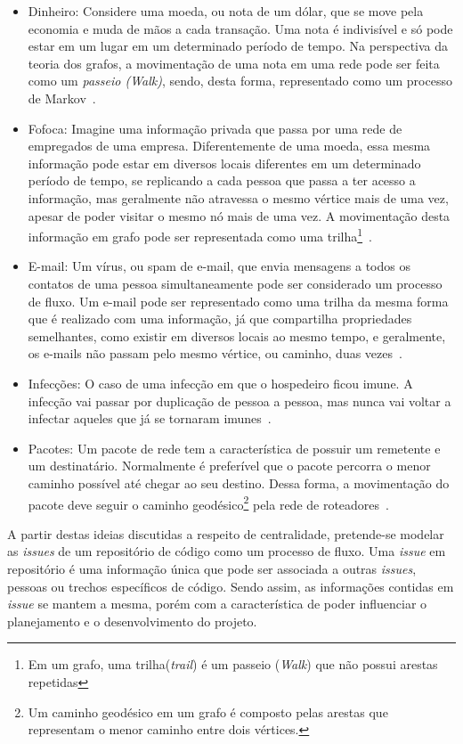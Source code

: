 \begin{itemize}
\item Dinheiro: Considere uma moeda, ou nota de um dólar, que se move pela economia e muda de mãos a cada transação. Uma nota é indivisível e só pode estar em um lugar em um determinado período de tempo. Na perspectiva da teoria dos grafos, a movimentação de uma nota em uma rede pode ser feita como um \textit{passeio (Walk)}, sendo, desta forma, representado como um processo de Markov~\cite{ceflow}.
\item Fofoca: Imagine uma informação privada que passa por uma rede de empregados de uma empresa. Diferentemente de uma moeda, essa mesma informação pode estar em diversos locais diferentes em um determinado período de tempo, se replicando a cada pessoa que passa a ter acesso a informação, mas geralmente não atravessa o mesmo vértice mais de uma vez, apesar de poder visitar o mesmo nó mais de uma vez. A movimentação desta informação em grafo pode ser representada como uma trilha\footnote{Em um grafo, uma trilha(\textit{trail}) é um passeio (\textit{Walk}) que não possui arestas repetidas}~\cite{ceflow}.
\item E-mail: Um vírus, ou spam de e-mail, que envia mensagens a todos os contatos de uma pessoa simultaneamente pode ser considerado um processo de fluxo. Um e-mail pode ser representado como uma trilha da mesma forma que é realizado com uma informação, já que compartilha propriedades semelhantes, como existir em diversos locais ao mesmo tempo, e geralmente, os e-mails não passam pelo mesmo vértice, ou caminho, duas vezes~\cite{ceflow}.
\item Infecções: O caso de uma infecção em que o hospedeiro ficou imune. A infecção vai passar por duplicação de pessoa a pessoa, mas nunca vai voltar a infectar aqueles que já se tornaram imunes~\cite{ceflow}.
\item Pacotes: Um pacote de rede tem a característica de possuir um remetente e um destinatário. Normalmente é preferível que o pacote percorra o menor caminho possível até chegar ao seu destino. Dessa forma, a movimentação do pacote deve seguir o caminho geodésico\footnote{Um caminho geodésico em um grafo é composto pelas arestas que representam o menor caminho entre dois vértices.} pela rede de roteadores~\cite{ceflow}. 
\end{itemize}

A partir destas ideias discutidas a respeito de centralidade, pretende-se modelar as \textit{issues} de um repositório de código como um processo de fluxo. Uma \textit{issue} em repositório é uma informação única que pode ser associada a outras \textit{issues}, pessoas ou trechos específicos de código. Sendo assim, as informações contidas em \textit{issue} se mantem a mesma, porém com a característica de poder influenciar o planejamento e o desenvolvimento do projeto.


